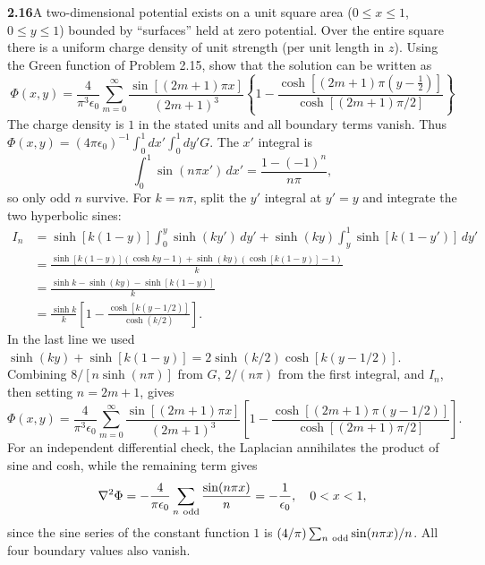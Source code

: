 \par\bigskip
\noindent\textbf{2.16}\quad A two-dimensional potential exists on a unit square area ($0\leq x\leq1$, $0\leq y\leq1$) bounded by ``surfaces'' held at zero potential. Over the entire square there is a uniform charge density of unit strength (per unit length in $z$). Using the Green function of Problem 2.15, show that the solution can be written as
\[
\Phi(x,y)=\frac{4}{\pi^{3}\epsilon_{0}}\sum_{m=0}^{\infty}\frac{\sin[(2m+1)\pi x]}{(2m+1)^{3}}\left\{1-\frac{\cosh[(2m+1)\pi(y-\frac{1}{2})]}{\cosh[(2m+1)\pi/2]}\right\}
\]
\solution
The charge density is $1$ in the stated units and all boundary terms
vanish. Thus
$\Phi(x,y)=(4\pi\epsilon _0)^{-1}\int_0^1dx'\int_0^1dy'G$.
The $x'$ integral is
\[
\int_0^1\sin(n\pi x')\,dx'=\frac{1-(-1)^n}{n\pi},
\]
so only odd $n$ survive. For $k=n\pi$, split the $y'$ integral at
$y'=y$ and integrate the two hyperbolic sines:
\begin{align*}
I_n&=\sinh[k(1-y)]\int_0^y\sinh(ky')\,dy'
    +\sinh(ky)\int_y^1\sinh[k(1-y')]\,dy'\\
&=\frac{\sinh[k(1-y)](\cosh ky-1)
       +\sinh(ky)(\cosh[k(1-y)]-1)}{k}\\
&=\frac{\sinh k-\sinh(ky)-\sinh[k(1-y)]}{k}\\
&=\frac{\sinh k}{k}
 \left[1-\frac{\cosh[k(y-1/2)]}{\cosh(k/2)}\right].
\end{align*}
In the last line we used
$\sinh(ky)+\sinh[k(1-y)]=2\sinh(k/2)\cosh[k(y-1/2)]$.
Combining $8/[n\sinh(n\pi)]$ from $G$, $2/(n\pi)$ from the
first integral, and $I_n$, then setting $n=2m+1$, gives
\[
\boxed{\Phi(x,y)=\frac4{\pi^3\epsilon _0}
 \sum_{m=0}^\infty\frac{\sin[(2m+1)\pi x]}{(2m+1)^3}
 \left[1-\frac{\cosh[(2m+1)\pi(y-1/2)]}
                  {\cosh[(2m+1)\pi/2]}\right].}
\]
For an independent differential check, the Laplacian annihilates
the product of sine and cosh, while the remaining term gives
\[
\nabla^2\Phi=-\frac4{\pi\epsilon _0}
 \sum_{n\ {\rm odd}}\frac{\sin(n\pi x)}n=-\frac1{\epsilon _0},
\quad 0<x<1,
\]
since the sine series of the constant function $1$ is
$(4/\pi)\sum_{n\ {\rm odd}}\sin(n\pi x)/n$.
All four boundary values also vanish.


